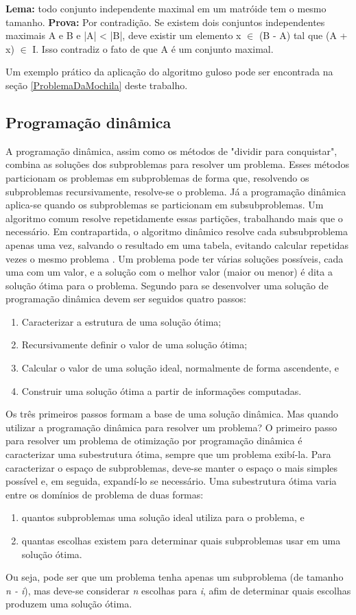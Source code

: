 \textbf{Lema:} todo conjunto independente maximal em um matróide tem o mesmo tamanho. 
\textbf{Prova:}  Por contradição. Se existem dois conjuntos independentes maximais A e B e |A| < |B|, deve existir um elemento x $\in$ (B - A) tal que (A + x) $\in$ I. Isso contradiz o fato de que A é um conjunto maximal.

Um exemplo prático da aplicação do algoritmo guloso pode ser encontrada na seção \ref{ProblemaDaMochila} deste trabalho.

\subsection{Programação dinâmica} \label{Programação dinâmica}
A programação dinâmica, assim como os métodos de "dividir para conquistar", combina as soluções dos subproblemas para resolver um problema. Esses métodos particionam os problemas em subproblemas de forma que, resolvendo os subproblemas recursivamente, resolve-se o problema. Já a programação dinâmica aplica-se quando os subproblemas se particionam em subsubproblemas. Um algoritmo comum resolve repetidamente essas partições, trabalhando mais que o necessário. Em contrapartida, o algoritmo dinâmico resolve cada subsubproblema apenas uma vez, salvando o resultado em uma tabela, evitando calcular repetidas vezes o mesmo problema \cite{cormen2009introduction}.
Um problema pode ter várias soluções possíveis, cada uma com um valor, e a solução com o melhor valor (maior ou menor) é dita a solução ótima para o problema.
Segundo \cite{cormen2009introduction} para se desenvolver uma solução de programação dinâmica devem ser seguidos quatro passos:
\begin{enumerate}
\item Caracterizar a estrutura de uma solução ótima;
\item Recursivamente definir o valor de uma solução ótima;
\item Calcular o valor de uma solução ideal, normalmente de forma ascendente, e
\item Construir uma solução ótima a partir de informações computadas. 
\end{enumerate}
Os três primeiros passos formam a base de uma solução dinâmica. Mas quando utilizar a programação dinâmica para resolver um problema? O primeiro passo para resolver um problema de otimização por programação dinâmica é caracterizar uma subestrutura ótima, sempre que um problema exibí-la. 
Para caracterizar o espaço de subproblemas, deve-se manter o espaço o mais simples possível e, em seguida, expandí-lo se necessário. Uma subestrutura ótima varia entre os domínios de problema de duas formas:
\begin{enumerate}[label=(\roman*)]
\item quantos subproblemas uma solução ideal utiliza para o problema, e
\item quantas escolhas existem para determinar quais subproblemas usar em uma solução ótima.
\end{enumerate}
Ou seja, pode ser que um problema tenha apenas um subproblema (de tamanho \textit{n - i}), mas deve-se considerar \textit{n} escolhas para \textit{i}, afim de determinar quais escolhas produzem uma solução ótima.

